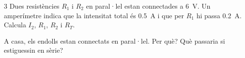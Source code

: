 \begin{exercici}{3}
Dues resistències $R_1$ i $R_2$ en paral·lel estan connectades a \SI{6}{V}. Un amperímetre indica que la intensitat total és \SI{0,5}{A} i que per $R_1$ hi passa \SI{0,2}{A}. Calcula $I_2$, $R_1$, $R_2$ i $R_T$.
\end{exercici}

\begin{comprova}
A casa, els endolls estan connectats en paral·lel. Per què? Què passaria si estiguessin en sèrie?
\end{comprova}
